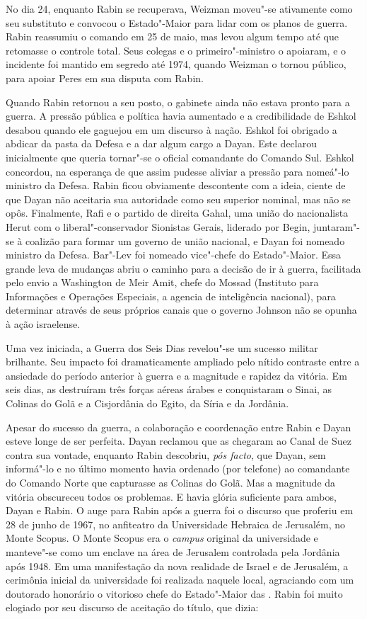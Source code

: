 No dia 24, enquanto Rabin se recuperava, Weizman moveu"-se ativamente
como seu substituto e convocou o Estado"-Maior para lidar com os planos
de guerra. Rabin reassumiu o comando em 25 de maio, mas levou algum
tempo até que retomasse o controle total. Seus colegas e o primeiro"-ministro
o apoiaram, e o incidente foi mantido em segredo até 1974,
quando Weizman o tornou público, para apoiar Peres em sua disputa com
Rabin.

Quando Rabin retornou a seu posto, o gabinete ainda não estava pronto
para a guerra. A pressão pública e política havia aumentado e a
credibilidade de Eshkol desabou quando ele gaguejou em um discurso à nação.
Eshkol foi obrigado a abdicar da pasta da Defesa e a dar algum cargo a
Dayan. Este declarou inicialmente que queria tornar"-se o oficial
comandante do Comando Sul. Eshkol concordou, na esperança de que assim
pudesse aliviar a pressão para nomeá"-lo ministro da Defesa. Rabin ficou
obviamente descontente com a ideia, ciente de que Dayan não aceitaria
sua autoridade como seu superior nominal, mas não se opôs. Finalmente,
Rafi e o partido de direita Gahal, uma união do nacionalista Herut com o
liberal"-conservador Sionistas Gerais, liderado por Begin, juntaram"-se à
coalizão para formar um governo de união nacional, e Dayan foi nomeado
ministro da Defesa. Bar"-Lev foi nomeado vice"-chefe do Estado"-Maior. Essa
grande leva de mudanças abriu o caminho para a decisão de ir à guerra,
facilitada pelo envio a Washington de Meir Amit, chefe do Mossad (Instituto para Informações e Operações Especiais, a
agencia de inteligência nacional), para determinar através de seus
próprios canais que o governo Johnson não se opunha à ação israelense.

Uma vez iniciada, a Guerra dos Seis Dias revelou"-se um sucesso militar
brilhante. Seu impacto foi dramaticamente ampliado pelo nítido contraste
entre a ansiedade do período anterior à guerra e a magnitude e rapidez
da vitória. Em seis dias, as  destruíram três forças aéreas árabes e
conquistaram o Sinai, as Colinas do Golã e a Cisjordânia do Egito, da
Síria e da Jordânia.

Apesar do sucesso da guerra, a colaboração e coordenação entre Rabin e
Dayan esteve longe de ser perfeita. Dayan reclamou que as  chegaram
ao Canal de Suez contra sua vontade, enquanto Rabin descobriu, \emph{pós
facto}, que Dayan, sem informá"-lo e no último momento havia ordenado
(por telefone) ao comandante do Comando Norte que capturasse as Colinas
do Golã. Mas a magnitude da vitória obscureceu todos os problemas. E
havia glória suficiente para ambos, Dayan e Rabin. O auge para Rabin
após a guerra foi o discurso que proferiu em 28 de junho de 1967, no
anfiteatro da Universidade Hebraica de Jerusalém, no Monte Scopus. O
Monte Scopus era o \emph{campus} original da universidade e manteve"-se como um
enclave na área de Jerusalem controlada pela Jordânia após 1948. Em uma
manifestação da nova realidade de Israel e de Jerusalém, a cerimônia
inicial da universidade foi realizada naquele local, agraciando com um
doutorado honorário o vitorioso chefe do Estado"-Maior das . Rabin foi
muito elogiado por seu discurso de aceitação do título, que dizia:

